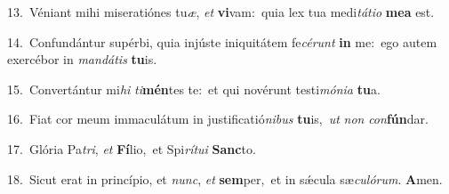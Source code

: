 {\numbfont\textcolor{\numbcolor}{13.}}~Véniant mihi miseratiónes tu\-\textit{æ}\-, \textit{et} \textbf{vi}\-vam:~\star quia lex tua medi\-\textit{tá}\-\textit{ti}\textit{o} \textbf{me}\-\textbf{a} est.\par
{\numbfont\textcolor{\numbcolor}{14.}}~Confundántur supérbi, quia injúste iniquitátem fe\-\textit{cé}\-\textit{runt} \textbf{in} me:~\star ego autem exercébor in \textit{man}\-\textit{dá}\textit{tis} \textbf{tu}\-is.\par
{\numbfont\textcolor{\numbcolor}{15.}}~Convertántur mi\textit{hi} \textit{ti}\-\textbf{mén}tes te:~\star et qui novérunt testi\-\textit{mó}\-\textit{ni}\textit{a} \textbf{tu}\-a.\par
{\numbfont\textcolor{\numbcolor}{16.}}~Fiat cor meum immaculátum in justificatió\-\textit{ni}\-\textit{bus} \textbf{tu}\-is,~\star \textit{ut} \textit{non} \textit{con}\-\textbf{fún}dar.\par
{\numbfont\textcolor{\numbcolor}{17.}}~Glória Pa\-\textit{tri}\-, \textit{et} \textbf{Fí}\-lio,~\star et Spi\-\textit{rí}\-\textit{tu}\textit{i} \textbf{Sanc}\-to.\par
{\numbfont\textcolor{\numbcolor}{18.}}~Sicut erat in princípio, et \textit{nunc}\-, \textit{et} \textbf{sem}\-per,~\star et in sǽcula sæ\-\textit{cu}\-\textit{ló}\textit{rum}. \textbf{A}\-men.\par
